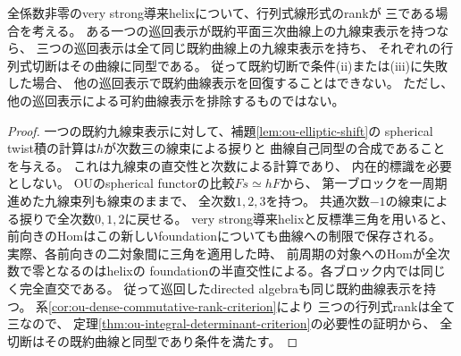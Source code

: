\begin{proposition}[既約表示と巡回表示の関係]
\label{prop:ou-integral-presentation-cyclic-invariant}
全係数非零のvery strong導来helixについて、行列式線形式のrankが
三である場合を考える。
ある一つの巡回表示が既約平面三次曲線上の九線束表示を持つなら、
三つの巡回表示は全て同じ既約曲線上の九線束表示を持ち、
それぞれの行列式切断はその曲線に同型である。
従って既約切断で条件(ii)または(iii)に失敗した場合、
他の巡回表示で既約曲線表示を回復することはできない。
ただし、他の巡回表示による可約曲線表示を排除するものではない。
\end{proposition}
\begin{proof}
一つの既約九線束表示に対して、補題\ref{lem:ou-elliptic-shift}の
spherical twist積の計算は$h$が次数三の線束による捩りと
曲線自己同型の合成であることを与える。
これは九線束の直交性と次数による計算であり、
内在的標識を必要としない。
OUのspherical functorの比較$Fs\simeq hF$から、
第一ブロックを一周期進めた九線束列も線束のままで、
全次数$1,2,3$を持つ。
共通次数$-1$の線束による捩りで全次数$0,1,2$に戻せる。
very strong導来helixと反標準三角を用いると、
前向きのHomはこの新しいfoundationについても曲線への制限で保存される。
実際、各前向きの二対象間に三角を適用した時、
前周期の対象へのHomが全次数で零となるのはhelixの
foundationの半直交性による。各ブロック内では同じく完全直交である。
従って巡回したdirected algebraも同じ既約曲線表示を持つ。
系\ref{cor:ou-dense-commutative-rank-criterion}により
三つの行列式rankは全て三なので、
定理\ref{thm:ou-integral-determinant-criterion}の必要性の証明から、
全切断はその既約曲線と同型であり条件を満たす。
\end{proof}

